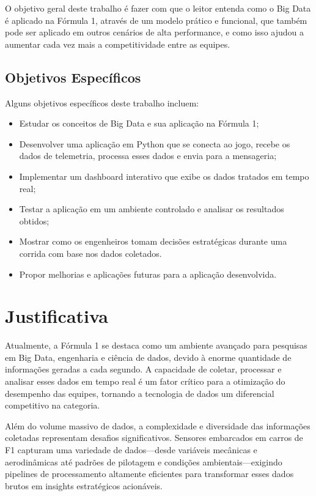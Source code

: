 \documentclass[12pt, %
openright, 
oneside, %
a4paper,    %
brazil]{facom-ufu-abntex2}
\begin{document}
O objetivo geral deste trabalho é fazer com que o leitor entenda como o Big Data é aplicado na Fórmula 1, através de um modelo prático e funcional, que também pode ser aplicado em outros cenários de alta performance,
e como isso ajudou a aumentar cada vez mais a competitividade entre as equipes.

\subsection{Objetivos Específicos}

Alguns objetivos específicos deste trabalho incluem:

\begin{itemize}
    \item Estudar os conceitos de Big Data e sua aplicação na Fórmula 1;
    \item Desenvolver uma aplicação em Python que se conecta ao jogo, recebe os dados de telemetria, processa esses dados e envia para a mensageria;
    \item Implementar um dashboard interativo que exibe os dados tratados em tempo real;
    \item Testar a aplicação em um ambiente controlado e analisar os resultados obtidos;
    \item Mostrar como os engenheiros tomam decisões estratégicas durante uma corrida com base nos dados coletados.
    \item Propor melhorias e aplicações futuras para a aplicação desenvolvida.
\end{itemize}

\section{Justificativa}

Atualmente, a Fórmula 1 se destaca como um ambiente avançado para pesquisas em Big Data, engenharia e ciência de dados, 
devido à enorme quantidade de informações geradas a cada segundo. A capacidade de coletar, processar e analisar esses dados em tempo real é um 
fator crítico para a otimização do desempenho das equipes, tornando a tecnologia de dados um diferencial competitivo na categoria.

Além do volume massivo de dados, a complexidade e diversidade das informações coletadas representam desafios significativos. 
Sensores embarcados em carros de F1 capturam uma variedade de dados—desde variáveis mecânicas e aerodinâmicas até padrões de pilotagem 
e condições ambientais—exigindo pipelines de processamento altamente eficientes para transformar esses dados brutos em insights estratégicos acionáveis.
\end{document}
